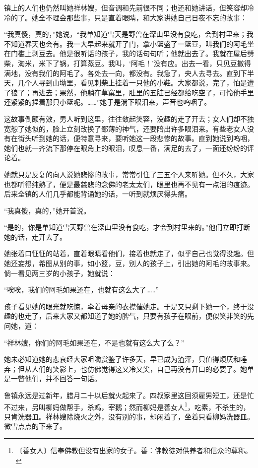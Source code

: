 \documentclass[12pt,UTF-8,openany]{ctexbook}
\begin{document}
\begin{large}
    镇上的人们也仍然叫她祥林嫂，但音调和先前很不同；也还和她讲话，但笑容却冷冷的了。她全不理会那些事，只是直着眼睛，和大家讲她自己日夜不忘的故事：
    
    “我真傻，真的，”她说，“我单知道雪天是野兽在深山里没有食吃，会到村里来；我不知道春天也会有。我一大早起来就开了门，拿小篮盛了一篮豆，叫我们的阿毛坐在门槛上剥豆去。他是很听话的孩子，我的话句句听；他就出去了。我就在屋后劈柴，淘米，米下了锅，打算蒸豆。我叫，‘阿毛！’没有应。出去一看，只见豆撒得满地，没有我们的阿毛了。各处去一向，都没有。我急了，央人去寻去。直到下半天，几个人寻到山坳里，看见刺柴上挂着一只他的小鞋。大家都说，完了，怕是遭了狼了；再进去；果然，他躺在草窠里，肚里的五脏已经都给吃空了，可怜他手里还紧紧的捏着那只小篮呢。……”她于是淌下眼泪来，声音也呜咽了。
    
    这故事倒颇有效，男人听到这里，往往敛起笑容，没趣的走了开去；女人们却不独宽恕了她似的，脸上立刻改换了鄙薄的神气，还要陪出许多眼泪来。有些老女人没有在街头听到她的话，便特意寻来，要听她这一段悲惨的故事。直到她说到呜咽，她们也就一齐流下那停在眼角上的眼泪，叹息一番，满足的去了，一面还纷纷的评论着。
    
    她就只是反复的向人说她悲惨的故事，常常引住了三五个人来听她。但不久，大家也都听得纯熟了，便是最慈悲的念佛的老太太们，眼里也再不见有一点泪的痕迹。后来全镇的人们几乎都能背诵她的话，一听到就烦厌得头痛。
    
    “我真傻，真的，”她开首说。
    
    “是的，你是单知道雪天野兽在深山里没有食吃，才会到村里来的。”他们立即打断她的话，走开去了。
    
    她张着口怔怔的站着，直着眼睛看他们，接着也就走了，似乎自己也觉得没趣。但她还妄想，希图从别的事，如小篮，豆，别人的孩子上，引出她的阿毛的故事来。倘一看见两三岁的小孩子，她就说：
    
    “唉唉，我们的阿毛如果还在，也就有这么大了……”
    
    孩子看见她的眼光就吃惊，牵着母亲的衣襟催她走。于是又只剩下她一个，终于没趣的也走了，后来大家又都知道了她的脾气，只要有孩子在眼前，便似笑非笑的先问她，道：
    
    “祥林嫂，你们的阿毛如果还在，不是也就有这么大了么？”
    
    她未必知道她的悲哀经大家咀嚼赏鉴了许多天，早已成为渣滓，只值得烦厌和唾弃；但从人们的笑影上，也仿佛觉得这又冷又尖，自己再没有开口的必要了。她单是一瞥他们，并不回答一句话。
    
    鲁镇永远是过新年，腊月二十以后就火起来了。四叔家里这回须雇男短工，还是忙不过来，另叫柳妈做帮手，杀鸡，宰鹅；然而柳妈是善女人\footnote{〔善女人〕信奉佛教但没有出家的女子。善：佛教徒对供养者和信众的尊称。}，吃素，不杀生的，只肯洗器皿。祥林嫂除烧火之外，没有别的事，却闲着了，坐着只看柳妈洗器皿。微雪点点的下来了。
    

\end{large}
\end{document}
